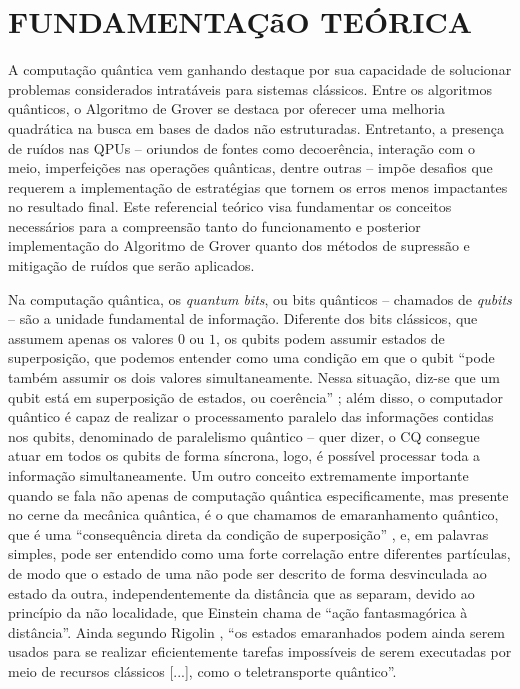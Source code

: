 \chapter{FUNDAMENTAÇ\~{a}O TEÓRICA}
\label{chap: fundamentacao}

A computaç\~{a}o qu\^{a}ntica vem ganhando destaque por sua capacidade de solucionar problemas considerados intrat\'{a}veis para sistemas cl\'{a}ssicos. Entre os algoritmos qu\^{a}nticos, o Algoritmo de Grover se destaca por oferecer uma melhoria quadr\'{a}tica na busca em bases de dados n\~{a}o estruturadas. Entretanto, a presença de ruídos nas QPUs – oriundos de fontes como decoer\^{e}ncia, interaç\~{a}o com o meio, imperfeições nas operações qu\^{a}nticas, dentre outras – impõe desafios que requerem a implementaç\~{a}o de estrat\'{e}gias que tornem os erros menos impactantes no resultado final. Este referencial teórico visa fundamentar os conceitos necess\'{a}rios para a compreens\~{a}o tanto do funcionamento e posterior implementaç\~{a}o do Algoritmo de Grover quanto dos m\'{e}todos de supress\~{a}o e mitigaç\~{a}o de ruídos que ser\~{a}o aplicados.

Na computaç\~{a}o qu\^{a}ntica, os \textit{quantum bits}, ou bits qu\^{a}nticos – chamados de \textit{qubits} – s\~{a}o a unidade fundamental de informaç\~{a}o. Diferente dos bits cl\'{a}ssicos, que assumem apenas os valores $0$ ou $1$, os qubits podem assumir estados de superposiç\~{a}o, que podemos entender como uma condiç\~{a}o em que o qubit “pode tamb\'{e}m assumir os dois valores simultaneamente. Nessa situaç\~{a}o, diz-se que  um  qubit  est\'{a}  em  superposiç\~{a}o  de  estados,  ou  coer\^{e}ncia” \cite{Cuzziol2023_Superposicao}; al\'{e}m disso, o computador qu\^{a}ntico \'{e} capaz de realizar o processamento paralelo das informações contidas nos qubits, denominado de paralelismo qu\^{a}ntico – quer dizer, o CQ consegue atuar em todos os qubits de forma síncrona, logo, \'{e} possível processar toda a informaç\~{a}o simultaneamente. Um outro conceito extremamente importante quando se fala n\~{a}o apenas de computaç\~{a}o qu\^{a}ntica especificamente, mas presente no cerne da mec\^{a}nica qu\^{a}ntica, \'{e} o que chamamos de emaranhamento qu\^{a}ntico, que \'{e} uma “consequ\^{e}ncia direta da condiç\~{a}o de superposiç\~{a}o” \cite{Rigolin2008_Emaranhamento}, e, em palavras simples, pode ser entendido como uma forte correlaç\~{a}o entre diferentes partículas, de modo que o estado de uma n\~{a}o pode ser descrito de forma desvinculada ao estado da outra, independentemente da dist\^{a}ncia que as separam, devido ao princípio da n\~{a}o localidade, que Einstein chama de “aç\~{a}o fantasmagórica à dist\^{a}ncia”. Ainda segundo Rigolin \citeyear{Rigolin2008_Emaranhamento}, “os estados emaranhados podem ainda serem usados para se realizar eficientemente tarefas impossíveis de serem executadas por meio de recursos cl\'{a}ssicos [...], como o teletransporte qu\^{a}ntico”.

